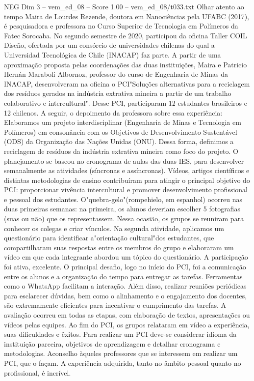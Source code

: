 \begin{textsample}{NEG Dim 3 – vem\_ed\_08 – Score 1.00 – vem\_ed\_08/t033.txt}  \label{ex:f3_neg_087}
Olhar atento ao tempo Maira de Lourdes Rezende, doutora em Nanociências pela UFABC (2017), é pesquisadora e professora no Curso Superior de Tecnologia em Polímeros da Fatec Sorocaba.
No segundo semestre de 2020, participou da oficina Taller COIL Diseño, ofertada por um consórcio de universidades chilenas do qual a Universidad Tecnológica de Chile (INACAP) faz parte.
A partir de uma aproximação proposta pelas coordenações das duas instituições, Maira e Patricio Hernán Marabolí Albornoz, professor do curso de Engenharia de Minas da INACAP, desenvolveram na oficina o PCI"Soluções alternativas para a reciclagem dos resíduos gerados na indústria extrativa mineira a partir de um trabalho colaborativo e intercultural".
Desse PCI, participaram 12 estudantes brasileiros e 12 chilenos.
A seguir, o depoimento da professora sobre essa experiência: Elaboramos um projeto interdisciplinar (Engenharia de Minas e Tecnologia em Polímeros) em consonância com os Objetivos de Desenvolvimento Sustentável (ODS) da Organização das Nações Unidas (ONU).
Dessa forma, definimos a reciclagem de resíduos da indústria extrativa mineira como foco do projeto.
O planejamento se baseou no cronograma de aulas das duas IES, para desenvolver semanalmente as atividades (síncronas e assíncronas).
Vídeos, artigos científicos e distintas metodologias de ensino contribuíram para atingir o principal objetivo do PCI: proporcionar vivência intercultural e promover desenvolvimento profissional e pessoal dos estudantes.
O"quebra-gelo"(rompehielo, em espanhol) ocorreu nas duas primeiras semanas: na primeira, os alunos deveriam escolher 5 fotografias (suas ou não) que os representassem.
Nessa ocasião, os grupos se reuniram para conhecer os colegas e criar vínculos.
Na segunda atividade, aplicamos um questionário para identificar a"orientação cultural"dos estudantes, que compartilharam suas respostas entre os membros do grupo e elaboraram um vídeo em que cada integrante abordou um tópico do questionário.
A participação foi ativa, excelente.
O principal desafio, logo no início do PCI, foi a comunicação entre os alunos e a organização do tempo para entregar as tarefas.
Ferramentas como o WhatsApp facilitam a interação.
Além disso, realizar reuniões periódicas para esclarecer dúvidas, bem como o alinhamento e o engajamento dos docentes, são extremamente eficientes para incentivar o cumprimento das tarefas.
A avaliação ocorreu em todas as etapas, com elaboração de textos, apresentações ou vídeos pelas equipes.
Ao fim do PCI, os grupos relataram em vídeo a experiência, suas dificuldades e êxitos.
Para realizar um PCI deve-se considerar idioma da instituição parceira, objetivos de aprendizagem e detalhar cronograma e metodologias.
Aconselho àqueles professores que se interessem em realizar um PCI, que o façam.
A experiência adquirida, tanto no âmbito pessoal quanto no profissional, é incrível.

\end{textsample}
